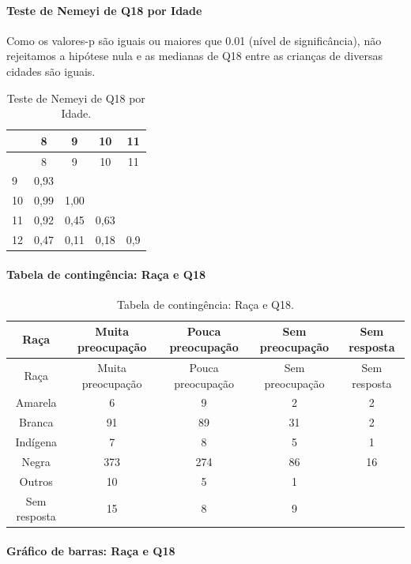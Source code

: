 \documentclass[]{article}
\let\oldparagraph\paragraph
\renewcommand{\paragraph}[1]{\oldparagraph{#1}\mbox{}}
\begin{document}
\hypertarget{teste-de-nemeyi-de-q18-por-idade}{%
\paragraph{Teste de Nemeyi de Q18 por Idade}\label{teste-de-nemeyi-de-q18-por-idade}}

Como os valores-p são iguais ou maiores que 0.01 (nível de significância), não rejeitamos a hipótese nula e as medianas de Q18 entre as crianças de diversas cidades são iguais.

\begin{longtable}[]{@{}lcccc@{}}
\caption{\label{tab:unnamed-chunk-277}Teste de Nemeyi de Q18 por Idade.}\tabularnewline
\toprule
& 8 & 9 & 10 & 11\tabularnewline
\midrule
\endfirsthead
\toprule
& 8 & 9 & 10 & 11\tabularnewline
\midrule
\endhead
9 & 0,93 & & &\tabularnewline
10 & 0,99 & 1,00 & &\tabularnewline
11 & 0,92 & 0,45 & 0,63 &\tabularnewline
12 & 0,47 & 0,11 & 0,18 & 0,9\tabularnewline
\bottomrule
\end{longtable}

\cleardoublepage

\hypertarget{tabela-de-continguxeancia-rauxe7a-e-q18}{%
\paragraph{Tabela de contingência: Raça e Q18}\label{tabela-de-continguxeancia-rauxe7a-e-q18}}

\begin{longtable}[]{@{}ccccc@{}}
\caption{\label{tab:unnamed-chunk-278}Tabela de contingência: Raça e Q18.}\tabularnewline
\toprule
Raça & Muita preocupação & Pouca preocupação & Sem preocupação & Sem resposta\tabularnewline
\midrule
\endfirsthead
\toprule
Raça & Muita preocupação & Pouca preocupação & Sem preocupação & Sem resposta\tabularnewline
\midrule
\endhead
Amarela & 6 & 9 & 2 & 2\tabularnewline
Branca & 91 & 89 & 31 & 2\tabularnewline
Indígena & 7 & 8 & 5 & 1\tabularnewline
Negra & 373 & 274 & 86 & 16\tabularnewline
Outros & 10 & 5 & 1 &\tabularnewline
Sem resposta & 15 & 8 & 9 &\tabularnewline
\bottomrule
\end{longtable}

\hypertarget{gruxe1fico-de-barras-rauxe7a-e-q18}{%
\paragraph{Gráfico de barras: Raça e Q18}\label{gruxe1fico-de-barras-rauxe7a-e-q18}}
\end{document}
